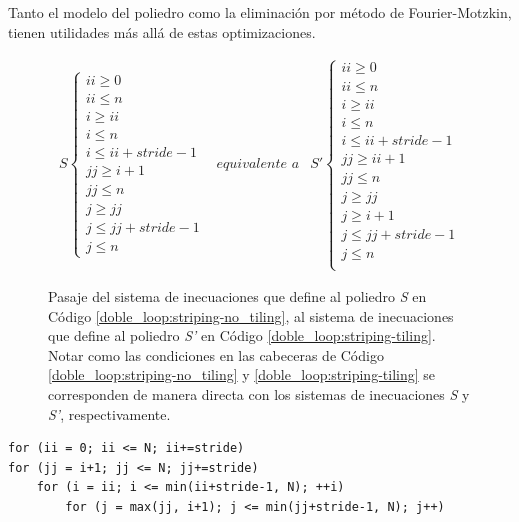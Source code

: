\documentclass{article}
\begin{document}
Tanto el modelo del poliedro como la eliminación por método de Fourier-Motzkin, tienen utilidades más allá
de estas optimizaciones.

\begin{figure}
\begin{displaymath}
	\begin{array}{rrr}
		S\begin{cases}
			ii\geq 0\\
			ii\leq n\\
			i\geq ii\\
			i\leq n\\
			i\leq ii+stride-1\\
			jj\geq i+1\\
			jj\leq n\\
			j\geq jj\\
			j\leq jj+stride-1\\
			j\leq n
		\end{cases}
		&
		\textit{equivalente a}
		&
		S'\begin{cases}
			ii\geq 0\\
			ii\leq n\\
			i\geq ii\\
			i\leq n\\
			i\leq ii+stride-1\\
			jj\geq ii+1\\
			jj\leq n\\
			j\geq jj\\
			j\geq i+1\\
			j\leq jj+stride-1\\
			j\leq n\\
		\end{cases}
	\end{array}
\end{displaymath}
	\caption{Pasaje del sistema de inecuaciones que define al poliedro \textit{S} en Código \ref{doble_loop:striping-no_tiling},
	al sistema de inecuaciones que define al poliedro \textit{S'} en Código \ref{doble_loop:striping-tiling}. Notar
	como las condiciones en las cabeceras de Código \ref{doble_loop:striping-no_tiling} y \ref{doble_loop:striping-tiling} se corresponden
	de manera directa con los sistemas de inecuaciones \textit{S} y \textit{S'}, respectivamente.}
	\label{fig:fourier_motzkin}
\end{figure}

\begin{lstlisting}[style=CStyle,label=doble_loop:striping-tiling,caption=doble loop con loop-tiling.]
for (ii = 0; ii <= N; ii+=stride)
for (jj = i+1; jj <= N; jj+=stride)
	for (i = ii; i <= min(ii+stride-1, N); ++i)
		for (j = max(jj, i+1); j <= min(jj+stride-1, N); j++)
\end{lstlisting}
\end{document}
